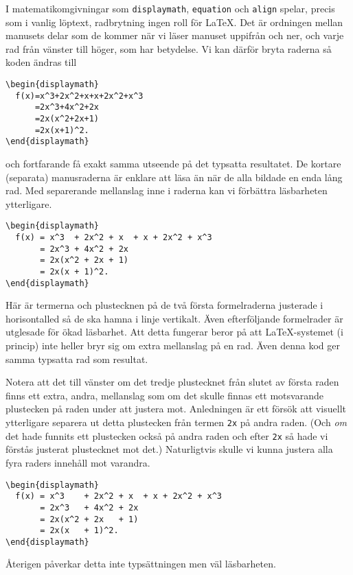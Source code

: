 \documentclass[a4paper,12pt]{article}
\begin{document}
I matematikomgivningar som \texttt{displaymath}, \texttt{equation}
och \texttt{align} spelar, precis som i vanlig löptext, radbrytning
ingen roll för \LaTeX. Det är ordningen mellan manusets delar som de
kommer när vi läser manuset uppifrån och ner, och varje rad från
vänster till höger, som har betydelse. Vi kan därför bryta raderna så
koden ändras till 
%
\begin{lstlisting}
\begin{displaymath}
  f(x)=x^3+2x^2+x+x+2x^2+x^3
      =2x^3+4x^2+2x
      =2x(x^2+2x+1)
      =2x(x+1)^2.
\end{displaymath}
\end{lstlisting}
%
och fortfarande få exakt samma utseende på det typsatta resultatet. De
kortare (separata) manusraderna är enklare att läsa än när de alla
bildade en enda lång rad. Med separerande mellanslag inne i raderna kan vi
förbättra läsbarheten ytterligare.  
%
\begin{lstlisting}
\begin{displaymath}
  f(x) = x^3  + 2x^2 + x  + x + 2x^2 + x^3
       = 2x^3 + 4x^2 + 2x
       = 2x(x^2 + 2x + 1)
       = 2x(x + 1)^2.
\end{displaymath}
\end{lstlisting}
%
Här är termerna och plustecknen på de två första formelraderna justerade i
horisontalled så de ska hamna i linje vertikalt. Även efterföljande
formelrader är utglesade för ökad läsbarhet. Att detta fungerar
beror på att \LaTeX-systemet (i princip) inte heller bryr sig om extra
mellanslag på en rad. Även denna kod ger samma typsatta rad som resultat. 


Notera att det till vänster om det tredje plustecknet från slutet av
första raden finns ett extra, andra, mellanslag som om det skulle finnas ett
motsvarande plustecken på raden under att justera mot. Anledningen är
ett försök att visuellt ytterligare separera ut detta plustecken från
termen \texttt{2x} på andra raden. (Och \emph{om} det hade funnits ett
plustecken också på andra raden och efter \texttt{2x} så hade vi
förstås justerat plustecknet mot det.) Naturligtvis skulle vi kunna
justera alla fyra raders innehåll mot varandra. 
%
\begin{lstlisting}
\begin{displaymath}
  f(x) = x^3    + 2x^2 + x  + x + 2x^2 + x^3
       = 2x^3   + 4x^2 + 2x
       = 2x(x^2 + 2x   + 1)
       = 2x(x   + 1)^2.
\end{displaymath}
\end{lstlisting}
%
Återigen påverkar detta inte typsättningen men väl läsbarheten.
\end{document}
